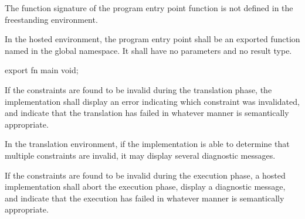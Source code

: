 \specsubsubitem
The function signature of the program entry point function is not defined in
the freestanding environment.


\specsubsubitem
In the hosted environment, the program entry point shall be an exported
function named  in the global namespace. It shall have no parameters
and no result type.


\begin{codesample}
export fn main void;
\end{codesample}



\specsubitem
If the constraints are found to be invalid during the translation phase, the
implementation shall display an error indicating which constraint was
invalidated, and indicate that the translation has failed in whatever manner is
semantically appropriate.


\specsubitem
In the translation environment, if the implementation is able to determine that
multiple constraints are invalid, it may display several diagnostic messages.

\specsubitem
If the constraints are found to be invalid during the execution phase, a hosted
implementation shall abort the execution phase, display a diagnostic message,
and indicate that the execution has failed in whatever manner is semantically
appropriate.

